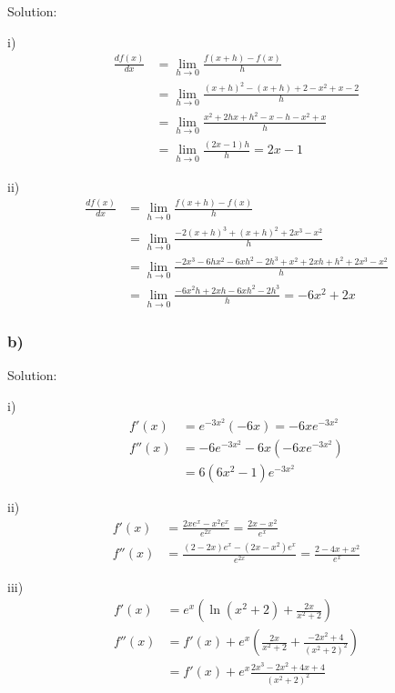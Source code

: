 \documentclass[letterpaper, 11pt]{article}
\newcommand{\1}{\mathds{1}}	%
\theoremstyle{definition}
\begin{document}
  Solution:

  i)
  \begin{align*}
    \frac{d f(x)}{dx} & = \lim_{h \to 0} \frac{f(x+h) - f(x)}{h}                            \\
                      & = \lim_{h \to 0} \frac{(x+h)^{2} - (x+h) + 2 - x ^{2} + x -2}{h}    \\
                      & = \lim_{h \to 0} \frac{x ^{2} + 2hx + h ^{2} - x -h - x ^{2} +x}{h} \\
                      & = \lim_{h \to 0} \frac{(2x-1)h}{h} = 2x-1
  \end{align*}

  ii)
  \begin{align*}
    \frac{d f(x)}{dx} & = \lim_{h \to 0} \frac{f(x+h) - f(x)}{h}                                                                        \\
                      & = \lim_{h \to 0} \frac{-2(x+h)^3 + (x+h) ^{2} + 2x ^{3}  - x ^{2}}{h}                                           \\
                      & = \lim_{h \to 0} \frac{-2 x ^{3} - 6hx ^{2} -6xh ^{2} - 2h ^{3} + x ^{2} + 2xh + h ^{2} + 2 x ^{3} - x ^{2}}{h} \\
                      & = \lim_{h \to 0} \frac{-6x ^{2} h + 2xh -6 xh ^{2} -2h ^{3}}{h} = -6 x ^{2} + 2x
  \end{align*}



  \subsubsection*{b)}

  Solution:

  i)
  \begin{align*}
    f'(x)  & = e ^{-3x ^{2}} (-6 x) = -6x e ^{-3 x^{2}} \\
    f''(x) & = -6e ^{-3 x^{2}} -6x (-6x e ^{-3 x^{2}})  \\
           & = 6(6x ^{2} - 1) e ^{-3 x ^{2}}
  \end{align*}

  ii)
  \begin{align*}
    f'(x)  & = \frac{2xe^{x} - x ^{2} e ^{x}}{e ^{2x}} = \frac{2x-x ^{2}}{e ^{x}}              \\
    f''(x) & = \frac{(2 - 2x)e ^{x}-(2x - x ^{2})e ^{x}}{e ^{2x}} = \frac{2-4x+x ^{2}}{e ^{x}}
  \end{align*}

  iii)
  \begin{align*}
    f'(x)  & = e ^{x}(\ln(x ^{2} + 2) + \frac{2x}{x ^{2} + 2})                                \\
    f''(x) & = f'(x) + e ^{x} (\frac{2x}{x ^{2} + 2} + \frac{-2x ^{2} + 4}{(x ^{2} + 2)^{2}}) \\
           & = f'(x) + e ^{x}\frac{2x ^{3} -2 x ^{2} + 4x + 4}{(x ^{2} + 2) ^{2}}
  \end{align*}
\end{document}
